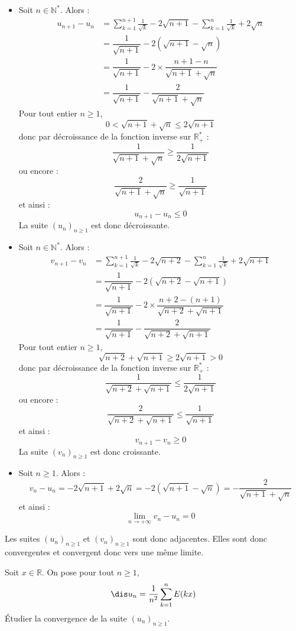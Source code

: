 \documentclass[a4paper,10pt]{report}
\begin{document}
\begin{itemize}
\item Soit $n \in \mathbb{N}^*$. Alors :
\begin{align*}
u_{n+1}-u_n & =  \sum_{k = 1}^{n+1} {\frac{1}{\sqrt k}} - 2\sqrt{n+1}  -\sum_{k = 1}^n {\frac{1}{\sqrt k}} + 2\sqrt{n}  \\
& = \dfrac{1}{\sqrt{n+1}} - 2 (\sqrt{n+1}-\sqrt{n}) \\
& = \dfrac{1}{\sqrt{n+1}} - 2 \times \dfrac{n+1-n}{\sqrt{n+1}+ \sqrt{n}} \\
& = \dfrac{1}{\sqrt{n+1}} - \dfrac{2}{\sqrt{n+1}+ \sqrt{n}}
\end{align*}
Pour tout entier $n \geq 1$,
$$ 0< \sqrt{n+1} + \sqrt{n} \leq 2 \sqrt{n+1}$$
donc par décroissance de la fonction inverse sur $\mathbb{R}_+^{*}$ :
$$ \dfrac{1}{\sqrt{n+1}+ \sqrt{n}} \geq \dfrac{1}{2 \sqrt{n+1}}$$
ou encore :
$$ \dfrac{2}{\sqrt{n+1}+\sqrt{n}} \geq \dfrac{1}{\sqrt{n+1}}$$
et ainsi :
$$ u_{n+1}-u_n \leq 0$$
La suite $(u_n)_{n \geq 1}$ est donc décroissante.
\item Soit $n \in \mathbb{N}^*$. Alors :
\begin{align*}
v_{n+1}-v_n & =  \sum_{k = 1}^{n+1} {\frac{1}{\sqrt k}} - 2\sqrt{n+2}  -\sum_{k = 1}^n {\frac{1}{\sqrt k}} + 2\sqrt{n+1}  \\
& = \dfrac{1}{\sqrt{n+1}} - 2 (\sqrt{n+2}-\sqrt{n+1}) \\
& = \dfrac{1}{\sqrt{n+1}} - 2 \times \dfrac{n+2-(n+1)}{\sqrt{n+2}+ \sqrt{n+1}} \\
& = \dfrac{1}{\sqrt{n+1}} - \dfrac{2}{\sqrt{n+2}+ \sqrt{n+1}}
\end{align*}
Pour tout entier $n \geq 1$,
$$ \sqrt{n+2} + \sqrt{n+1} \geq 2 \sqrt{n+1} > 0$$
donc par décroissance de la fonction inverse sur $\mathbb{R}_+^{*}$ :
$$ \dfrac{1}{\sqrt{n+2}+ \sqrt{n+1}} \leq \dfrac{1}{2 \sqrt{n+1}}$$
ou encore :
$$ \dfrac{2}{\sqrt{n+2}+\sqrt{n+1}} \leq \dfrac{1}{\sqrt{n+1}}$$
et ainsi :
$$ v_{n+1}-v_n \geq 0$$
La suite $(v_n)_{n \geq 1}$ est donc croissante.
\item Soit $n \geq 1$. Alors :
$$ v_n- u_n = -2 \sqrt{n+1} + 2 \sqrt{n} = -2 (\sqrt{n+1}-\sqrt{n}) = -\dfrac{2}{\sqrt{n+1}+\sqrt{n}}$$
et ainsi :
$$ \lim_{n \rightarrow + \infty} v_n -u_n = 0$$
\end{itemize}
Les suites $(u_n)_{n \geq 1}$ et $(v_n)_{n \geq 1}$ sont donc adjacentes. Elles sont donc convergentes et convergent donc vers une même limite.
 
 \medskip
 
\begin{Exa} Soit $x \in \mathbb{R}$. On pose pour tout $n \geq 1$, 
$$\dis u_n = \frac{1}{n^2} \sum_{k=1}^n E(kx)$$
Étudier la convergence de la suite $(u_n)_{n \geq 1}$.
\end{Exa}
\end{document}
